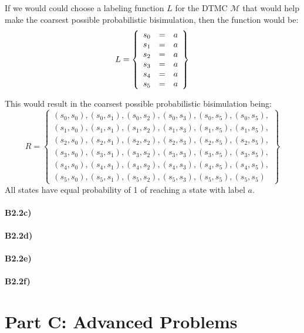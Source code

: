 \documentclass[12pt]{report}
\begin{document}
If we would could choose a labeling function $L$ for the DTMC $\mathcal{M}$ that would help make the coarsest possible probabilistic bisimulation, then the function would be:
$$L = \left\{\begin{array}{l c r}
s_0 & = & a\\
s_1 & = & a\\
s_2 & = & a\\
s_3 & = & a\\
s_4 & = & a\\
s_5 & = & a
\end{array}\right\}$$


This would result in the coarsest possible probabilistic bisimulation being:
$$R = \left\{\begin{array}{c}
(s_0, s_0),(s_0,s_1),(s_0,s_2),(s_0,s_3),(s_0,s_5),(s_0,s_5),\\
(s_1, s_0),(s_1,s_1),(s_1,s_2),(s_1,s_3),(s_1,s_5),(s_1,s_5),\\
(s_2, s_0),(s_2,s_1),(s_2,s_2),(s_2,s_3),(s_2,s_5),(s_2,s_5),\\
(s_3, s_0),(s_3,s_1),(s_3,s_2),(s_3,s_3),(s_3,s_5),(s_3,s_5),\\
(s_4, s_0),(s_4,s_1),(s_4,s_2),(s_4,s_3),(s_4,s_5),(s_4,s_5),\\
(s_5, s_0),(s_5,s_1),(s_5,s_2),(s_5,s_3),(s_5,s_5),(s_5,s_5)
\end{array}\right\}$$
All states have equal probability of 1 of reaching a state with label $a$. 


\subsubsection*{B2.2c)}
\subsubsection*{B2.2d)}
\subsubsection*{B2.2e)}
\subsubsection*{B2.2f)}

\chapter*{Part C: Advanced Problems}
\end{document}
